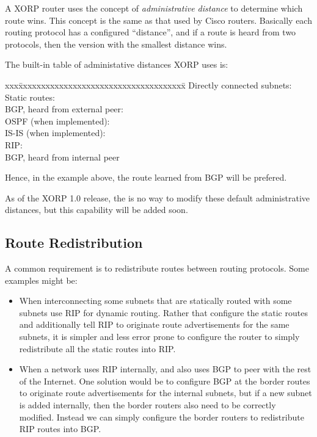 A XORP router uses the concept of {\it administrative distance} to
determine which route wins.  This concept is the same as that used by
Cisco routers.  Basically each routing protocol has a configured
``distance'', and if a route is heard from two protocols, then the
version with the smallest distance wins.

The built-in table of administative distances XORP uses is:
\begin{tabbing}
xxx\=xxxxxxxxxxxxxxxxxxxxxxxxxxxxxxxxxxxxx\=\kill
\>Directly connected subnets: \\
\>Static routes:\\
\>BGP, heard from external peer:\\
\>OSPF (when implemented):\\
\>IS-IS (when implemented):\\
\>RIP:\\
\>BGP, heard from internal peer\\
\end{tabbing}
Hence, in the example above, the route learned from BGP will be prefered.

As of the XORP 1.0 release, the is no way to modify these default
administrative distances, but this capability will be added soon.

\subsection{Route Redistribution}

A common requirement is to redistribute routes between routing
protocols.  Some examples might be:

\begin{itemize}
\item When interconnecting some subnets that are statically routed
  with some subnets use RIP for dynamic routing.  Rather
  that configure the static routes and additionally tell RIP to
  originate route advertisements for the same subnets, it is simpler
  and less error prone to configure the router to simply redistribute
  all the static routes into RIP.
\item When a network uses RIP internally, and also uses BGP to
  peer with the rest of the Internet.  One solution would be to
  configure BGP at the border routes to originate route advertisements
  for the internal subnets, but if a new subnet is added internally,
  then the border routers also need to be correctly modified.  Instead
  we can simply configure the border routers to redistribute RIP
  routes into BGP.  
\end{itemize}


